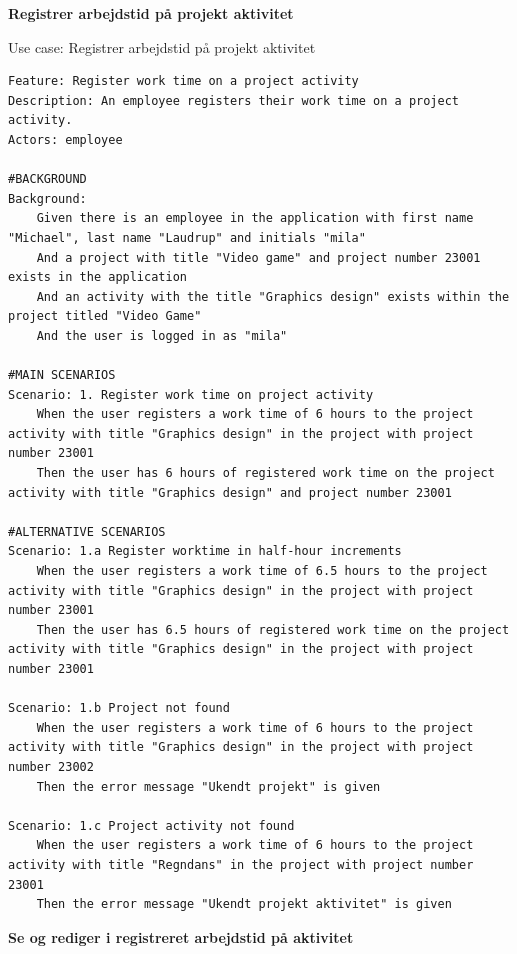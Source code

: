 \textbf{Registrer arbejdstid på projekt aktivitet}
\begin{listing}[H]
    \centering
    \caption{Use case: Registrer arbejdstid på projekt aktivitet} \label{lst:usecase_register_worktime_projectactivity}
    \begin{verbatim}  
Feature: Register work time on a project activity
Description: An employee registers their work time on a project activity.
Actors: employee

#BACKGROUND
Background:
    Given there is an employee in the application with first name "Michael", last name "Laudrup" and initials "mila"
    And a project with title "Video game" and project number 23001 exists in the application
    And an activity with the title "Graphics design" exists within the project titled "Video Game"
    And the user is logged in as "mila"

#MAIN SCENARIOS
Scenario: 1. Register work time on project activity
    When the user registers a work time of 6 hours to the project activity with title "Graphics design" in the project with project number 23001
    Then the user has 6 hours of registered work time on the project activity with title "Graphics design" and project number 23001

#ALTERNATIVE SCENARIOS
Scenario: 1.a Register worktime in half-hour increments
    When the user registers a work time of 6.5 hours to the project activity with title "Graphics design" in the project with project number 23001
    Then the user has 6.5 hours of registered work time on the project activity with title "Graphics design" in the project with project number 23001

Scenario: 1.b Project not found
    When the user registers a work time of 6 hours to the project activity with title "Graphics design" in the project with project number 23002
    Then the error message "Ukendt projekt" is given 
    
Scenario: 1.c Project activity not found
    When the user registers a work time of 6 hours to the project activity with title "Regndans" in the project with project number 23001
    Then the error message "Ukendt projekt aktivitet" is given 
    \end{verbatim}
\end{listing}
\textbf{Se og rediger i registreret arbejdstid på aktivitet}
